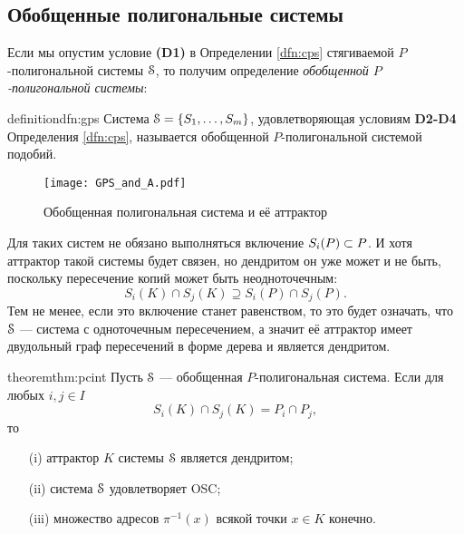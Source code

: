 \subsection{Обобщенные полигональные системы}



Если мы опустим условие {\bf(D1)} в Определении \ref{dfn:cps} стягиваемой $P$-полигональной системы ${\EuScript S}$, то получим определение {\em обобщенной $P$-полигональной системы}:

\begin{restatethis}{definition}{dfn:gps} \label{dfn:gps}
Система ${\EuScript S}=\{S_1,\ldots ,S_m\} $, удовлетворяющая условиям {\bf D2-D4} Определения \ref{dfn:cps}, называется обобщенной $P$-полигональной системой подобий.    
\end{restatethis}

\begin{figure}[h!]
    \centering
    \texttt{[image: GPS\_and\_A.pdf]}
    \caption{Обобщенная полигональная система и её аттрактор}
    \label{img:ops}
\end{figure}

Для таких систем не обязано выполняться включение $S_i(P)\subset P$.
И хотя аттрактор такой системы будет связен, но дендритом он уже может и не быть, поскольку пересечение копий может быть неодноточечным:
$$S_i(K)\cap S_j(K)\supseteq S_i(P)\cap S_j(P).$$
Тем не менее, если это включение станет равенством, то это будет означать, что ${\EuScript S}$ --- система с одноточечным пересечением, а значит её аттрактор имеет двудольный граф пересечений в форме дерева и является дендритом.



\begin{restatethis}{theorem}{thm:pcint}\label{thm:pcint}
Пусть ${\EuScript S}$ --- обобщенная $P$-полигональная система.  
Если для любых $i, j \in I$ 
\begin{equation}\label{icnd}
S_i(K)\cap S_j(K)=P_i\cap P_j,
\end{equation} 
то 
\begin{itemize}[nolistsep]
    \item[(i)] аттрактор $K$ системы ${\EuScript S}$ является дендритом;
    \item[(ii)] система ${\EuScript S}$ удовлетворяет OSC;
    \item[(iii)] множество адресов $\pi^{-1}(x)$ всякой точки $x\in K$ конечно.
\end{itemize}
   
\end{restatethis}


